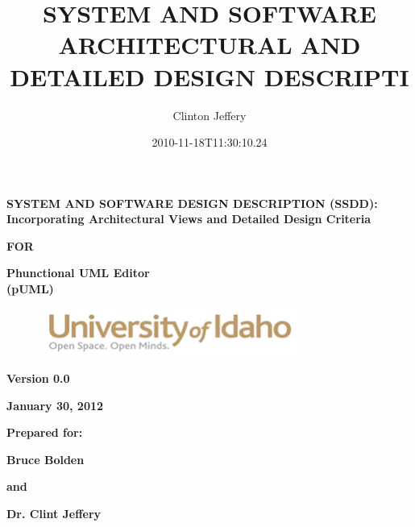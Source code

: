 \documentclass[twoside,letterpaper]{article}
\title{SYSTEM AND SOFTWARE ARCHITECTURAL AND DETAILED DESIGN DESCRIPTI}
\author{Clinton Jeffery}
\date{2010-11-18T11:30:10.24}
\begin{document}
\clearpage

{\centering{}\bfseries\color{black}
SYSTEM AND SOFTWARE DESIGN DESCRIPTION (SSDD): Incorporating
Architectural Views and Detailed Design Criteria
\par}

{\centering{}\bfseries\color{black}
FOR
\par}


\bigskip

{\centering{}\bfseries\color{black}
Phunctional UML Editor
\\(pUML)
\par}


\bigskip


\bigskip


\bigskip

{\centering \par}

\begin{figure}
\centering
\includegraphics[width=3.4354in,height=0.6126in]{SSDDTemplateA2-img1.png}
\end{figure}

\bigskip


\bigskip


\bigskip


\bigskip

{\centering{}\bfseries\color{black}
Version 0.0
\par}

{\centering{}\bfseries\color{black}
January 30, 2012
\par}


\bigskip


\bigskip

{\centering{}\bfseries\color{black}
Prepared for:
\par}
{\centering{}\bfseries\color{black}
Bruce Bolden
\par}
{\centering{}\bfseries\color{black}
and
\par}
{\centering{}\bfseries\color{black}
Dr. Clint Jeffery
\par}

\bigskip
\end{document}
